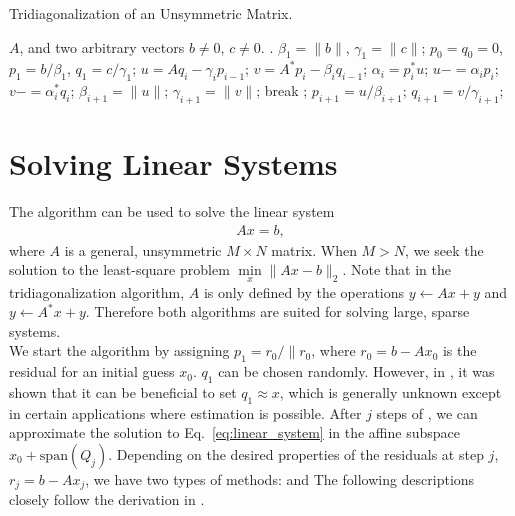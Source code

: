 \documentclass[10pt,letterpaper]{article}
\newcommand{\alg}[1]{\textproc{#1}}
\def\alfa{\alpha}
\def\gama{\gamma}
\def\Span{\text{span}}
\begin{document}
\begin{algorithm}[H]
\caption{Tridiagonalization of an Unsymmetric Matrix.}
\label{Alg:Tridiagonalization}
\begin{algorithmic}[1]
\Require $A$, and two arbitrary vectors $b \neq 0$, $c \neq 0$. 
. 
\State $\beta_1 = \|b\|$, $\gama_1 = \|c\|$;
\State $p_0 = q_0 = 0$, $p_1 = b/\beta_1$, $q_1 = c/\gama_1$;
    \State $u = A   q_i - \gama_i p_{i-1}$;
    \State $v = A^* p_i - \beta_i q_{i-1}$;
    \State $\alfa_i = p_i^* u$;
    \State $u -= \alfa_i   p_i$; 
    \State $v -= \alfa_i^* q_i$; 
    \State $\beta_{i+1} = \|u\|$; 
    \State $\gama_{i+1} = \|v\|$; 
    \If{$\beta_{i+1} = 0\,\,\textbf{or} \,\,\gama_{i+1} = 0$}
        \State break ; 
    \Else
        \State $p_{i+1} = u / \beta_{i+1}$;  
        \State $q_{i+1} = v / \gama_{i+1}$;  
    \EndIf
\EndFor
\EndFunction
\end{algorithmic}
\end{algorithm}

\section{Solving Linear Systems}
The algorithm  can be used to solve the linear system
\begin{align} 
    A x = b, \label{eq:linear_system}
\end{align}
where $A$ is a general, unsymmetric $M\times N$ matrix. When $M > N$, 
we seek the solution to the least-square problem 
$\min\limits_x \|A x - b \|_2$. Note that in the tridiagonalization 
algorithm, $A$ is only defined by the operations $y \leftarrow Ax + y$ 
and $y \leftarrow A^* x + y$. Therefore both algorithms are suited for
solving large, sparse systems.\\

We start the algorithm by assigning $p_1 = r_0 / \|r_0$, where 
$r_0 = b - A x_0$ is the residual for an initial guess $x_0$.
$q_1$ can be chosen randomly. However, in \cite{reichel:2008}, it was
shown that it can be beneficial to set $q_1 \approx x$, which is 
generally unknown except in certain applications where estimation is
possible. After $j$ steps of , we can approximate 
the solution to Eq.~\eqref{eq:linear_system} in the affine subspace 
$x_0 + \Span(Q_j)$. Depending on the desired properties of the residuals
at step $j$, $r_j = b - A x_j$, we have two types of methods: 
\alg{USYMLQ} and \alg{USYMQR} The following descriptions closely follow
the derivation in \cite{saunders:1988}.
\end{document}
